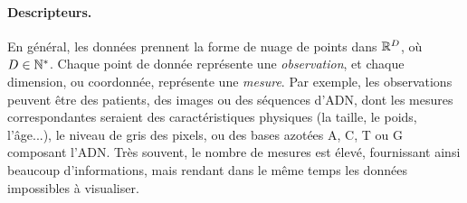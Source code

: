     

\paragraph*{Descripteurs.} En g\'en\'eral, les donn\'ees prennent la forme de nuage de points dans $\mathbb{R}^D$, o\`u $D\in\mathbb{N}^*$.
Chaque point de donn\'ee repr\'esente une {\em observation}, et chaque dimension, ou coordonn\'ee, repr\'esente une {\em mesure}.
Par exemple, les observations peuvent \^etre des patients, des images ou des s\'equences d'ADN, dont les mesures correspondantes seraient
des caract\'eristiques physiques (la taille, le poids, l'\^age...), le niveau de gris des pixels, ou des bases azot\'ees A, C, T ou G composant l'ADN.
Tr\`es souvent, le nombre de mesures est \'elev\'e, fournissant ainsi beaucoup d'informations, mais rendant 
dans le m\^eme temps les donn\'ees impossibles \`a visualiser.

